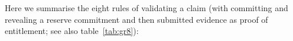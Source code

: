 Here we summarise the eight rules of validating a claim (with committing and revealing a reserve commitment and then submitted evidence as proof of entitlement; see also table~\ref{tab:gr8}):%
%
%
